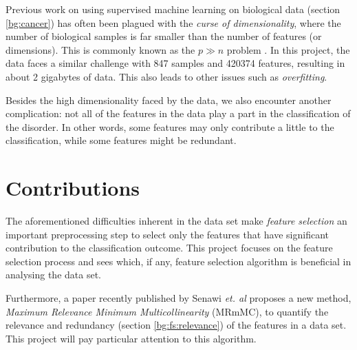 \documentclass[12pt, twoside, a4paper]{report}
\begin{document}
Previous work on using supervised machine learning on biological data (section \ref{bg:cancer}) has often been plagued with the \textit{curse of dimensionality}, where the number of biological samples is far smaller than the number of features (or dimensions). This is commonly known as the $p \gg n$ problem \cite{RefWorks:96}. In this project, the data faces a similar challenge with 847 samples and 420374 features, resulting in about 2 gigabytes of data. This also leads to other issues such as \textit{overfitting}. 

Besides the high dimensionality faced by the data, we also encounter another complication: not all of the features in the data play a part in the classification of the disorder. In other words, some features may only contribute a little to the classification, while some features might be redundant.




\section{Contributions}
The aforementioned difficulties inherent in the data set make \textit{feature selection} an important preprocessing step to select only the features that have significant contribution to the classification outcome. This project focuses on the feature selection process and sees which, if any, feature selection algorithm is beneficial in analysing the data set.

Furthermore, a paper recently published by Senawi \textit{et. al} \cite{RefWorks:187} proposes a new method, \textit{Maximum Relevance Minimum Multicollinearity} (MRmMC), to quantify the relevance and redundancy (section \ref{bg:fs:relevance}) of the features in a data set. This project will pay particular attention to this algorithm.
\end{document}
